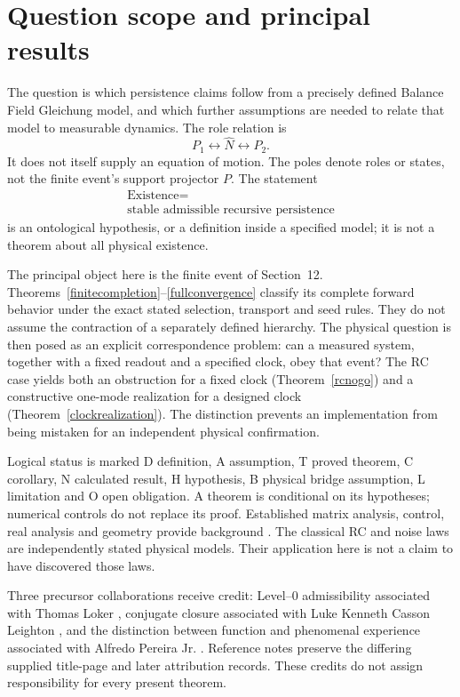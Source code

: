 \documentclass[11pt,letterpaper]{article}
\theoremstyle{definition}
\numberwithin{equation}{section}
\begin{document}
\section{Question scope and principal results}
The question is which persistence claims follow from a precisely defined Balance Field Gleichung model, and which further assumptions are needed to relate that model to measurable dynamics. The role relation is
\begin{equation}\label{triad}P_1\longleftrightarrow\widehat N\longleftrightarrow P_2.\end{equation}
It does not itself supply an equation of motion. The poles denote roles or states, not the finite event's support projector $P$. The statement
\begin{equation}\begin{gathered}\text{Existence}=\\\text{stable admissible recursive persistence}\end{gathered}\end{equation}
is an ontological hypothesis, or a definition inside a specified model; it is not a theorem about all physical existence.

The principal object here is the finite event of Section~12. Theorems~\ref{finitecompletion}--\ref{fullconvergence} classify its complete forward behavior under the exact stated selection, transport and seed rules. They do not assume the contraction of a separately defined hierarchy. The physical question is then posed as an explicit correspondence problem: can a measured system, together with a fixed readout and a specified clock, obey that event? The RC case yields both an obstruction for a fixed clock (Theorem~\ref{rcnogo}) and a constructive one-mode realization for a designed clock (Theorem~\ref{clockrealization}). The distinction prevents an implementation from being mistaken for an independent physical confirmation.

Logical status is marked D definition, A assumption, T proved theorem, C corollary, N calculated result, H hypothesis, B physical bridge assumption, L limitation and O open obligation. A theorem is conditional on its hypotheses; numerical controls do not replace its proof. Established matrix analysis, control, real analysis and geometry provide background \cite{horn,higham,boyd,analysis,tonggr,vmls}. The classical RC and noise laws are independently stated physical models. Their application here is not a claim to have discovered those laws.

Three precursor collaborations receive credit: Level--0 admissibility associated with Thomas Loker \cite{level0}, conjugate closure associated with Luke Kenneth Casson Leighton \cite{conjugate}, and the distinction between function and phenomenal experience associated with Alfredo Pereira Jr. \cite{pereira}. Reference notes preserve the differing supplied title-page and later attribution records. These credits do not assign responsibility for every present theorem.
\end{document}
